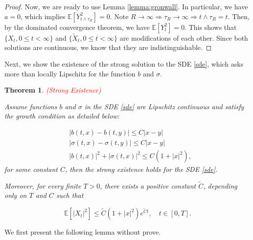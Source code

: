\documentclass{article}
\newtheorem{theorem}{Theorem}
\begin{document}
\begin{proof}
Now, we are ready to use Lemma \ref{lemma:gronwall}. In particular, we have $a=0$, which implies $\mathbb{E}[Y_{t\wedge\tau_R}^2]=0$. Note $R\rightarrow\infty\Rightarrow\tau_R\rightarrow\infty\Rightarrow t\wedge\tau_R=t$. Then, by the dominated convergence theorem, we have $\mathbb{E}[Y_{t}^2]=0$. This shows that $\{X_t,0\leq t<\infty\}$ and $\{\tilde{X}_t,0\leq t<\infty\}$ are modifications of each other. Since both solutions are continuous, we know that they are indistinguishable.

\end{proof}

Next, we show the existence of the strong solution to the SDE \eqref{sde}, which asks more than locally Lipschitz for the function $b$ and $\sigma$. 

\begin{theorem} \label{thm:strong_existence} \textcolor{red}{(Strong Existence)}

Assume functions $b$ and $\sigma$ in the SDE \eqref{sde} are Lipschitz continuous and satisfy the growth condition as detailed below:

\begin{equation*}
\begin{aligned}
&|b(t,x)-b(t,y)|\leq C|x-y|\\
&|\sigma(t,x)-\sigma(t,y)|\leq C|x-y|\\
&|b(t,x)|^2+|\sigma(t,x)|^2\leq C(1+|x|^2),
\end{aligned}
\end{equation*}
for some constant $C$, then the strong existence holds for the SDE \eqref{sde}. 

Moreover, for every finite $T>0$, there exists a positive constant $\tilde{C}$, depending only on $T$ and $C$ such that

\begin{equation} \label{thm:strong_existence_integrability}
\mathbb{E}[|X_t|^2]\leq\tilde{C}(1+|x|^2)e^{\tilde{C}t}, \quad t\in[0,T].
\end{equation}

\end{theorem}

We first present the following lemma without prove.
\end{document}
